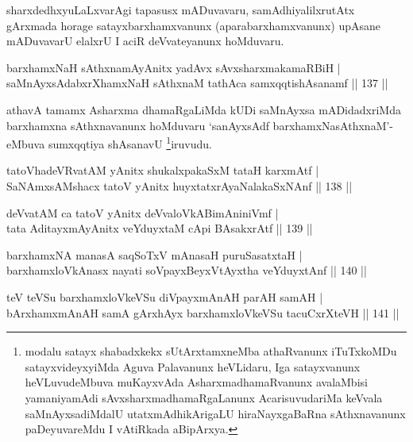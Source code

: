 \begin{artha}
sharxdedhxyuLaLxvarAgi tapasusx mADuvavaru, samAdhiyalilxrutAtx
gArxmada horage satayxbarxhamxvanunx (aparabarxhamxvanunx) upAsane
mADuvavarU elalxrU I aciR deVvateyanunx hoMduvaru.
\end{artha}


\begin{shl}
barxhamxNaH sAthxnamAyAnitx yadAvx sAvxsharxmakamaRBiH | \\
saMnAyxsAdabxrXhamxNaH sAthxnaM tathAca samxqqtishAsanamf \hfill|| 137 || 
\end{shl}

\begin{artha}
athavA tamamx Asharxma dhamaRgaLiMda kUDi saMnAyxsa mADidadxriMda
barxhamxna sAthxnavanunx hoMduvaru `sanAyxsAdf barxhamxNasAthxnaM'- eMbuva sumxqqtiya
shAsanavU \footnote{modalu satayx shabadxkekx sUtArxtamxneMba
  athaRvanunx iTuTxkoMDu satayxvideyxyiMda Aguva Pala\-vanunx heVLidaru,
Iga satayxvanunx heVLuvudeMbuva muKayxvAda AsharxmadhamaRvanunx
avalaMbisi yama\-niyamAdi sAvxsharxmadhamaRgaLanunx AcarisuvudariMa
keVvala saMnAyxsadiMdalU utatxmAdhikAri\-gaLU hiraNayxgaBaRna
sAthxnavanunx paDeyuvareMdu I vAtiRkada aBipArxya.}iruvudu.
\end{artha}



\begin{shl}
tatoV\s hadeVRvatAM yAnitx shukalxpakaSxM tataH karxmAtf | \\
SaNAmxsAMshacx tatoV yAnitx huyxtatxrAyaNalakaSxNAnf \hfill|| 138 || 
\end{shl}

\begin{shl}
deVvatAM ca tatoV yAnitx deVvaloVkABimAniniVmf | \\
tata AditayxmAyAnitx veYduyxtaM cApi BAsakxrAtf \hfill|| 139 || 
\end{shl}

\begin{shl}
barxhamxNA manasA saqSoTxV mAnasaH puruSasatxtaH | \\
barxhamxloVkAnasx nayati soV\s payxBeyxVtAyxtha veYduyxtAnf \hfill|| 140 || 
\end{shl}

\begin{shl}
teV teVSu barxhamxloVkeVSu diVpayxmAnAH parAH samAH | \\
bArxhamxmAnAH samA gArxhAyx barxhamxloVkeVSu tacuCxrXteVH \hfill|| 141 || 
\end{shl}

